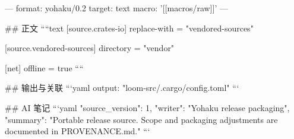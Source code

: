 ---
format: yohaku/0.2
target: text
macro: '[[macros/raw]]'
---

## 正文
````text
[source.crates-io]
replace-with = "vendored-sources"

[source.vendored-sources]
directory = "vendor"

[net]
offline = true
````

## 输出与关联
```yaml
output: "loom-src/.cargo/config.toml"
```

## AI 笔记
```yaml
{"source_version": 1, "writer": "Yohaku release packaging", "summary": "Portable release source. Scope and packaging adjustments are documented in PROVENANCE.md."}
```
